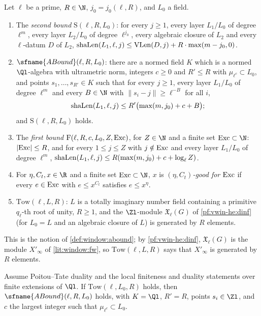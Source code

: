 \begin{definition}\label{pf:vwin:abound}
Let $\ell$ be a prime, $R\in\N$, $j_0=j_0(\ell,R)$, and $L_0$ a field.
\begin{enumerate}[label=(\alph*)]
\item The \emph{second bound} $\mathrm{S}(\ell,R,L_0)$: for every $j\ge1$, every layer $L_1/L_0$ of degree $\ell^m$, every
layer $L_2/L_0$ of degree $\ell^{j_0}$, every algebraic closure of $L_2$ and every $\ell$-datum $D$ of $L_2$,
$\mathrm{shaLen}(L_1,\ell,j)\le\mathrm{VLen}(D,j)+R\cdot\max(m-j_0,0)$.
\item $\sfname{ABound}(\ell,R,L_0)$: there are a normed field $K$ which is a normed $\Ql$-algebra with ultrametric norm,
integers $c\ge0$ and $R'\le R$ with $\mu_{\ell^c}\subset L_0$, and points $s_1,\dots,s_{R'}\in K$ such that for every $j\ge1$,
every layer $L_1/L_0$ of degree $\ell^m$ and every $B\in\N$ with $\|s_i-j\|\ge\ell^{-B}$ for all $i$,
\[
 \mathrm{shaLen}(L_1,\ell,j)\le R'\bigl(\max(m,j_0)+c+B\bigr);
\]
and $\mathrm{S}(\ell,R,L_0)$ holds.
\item The \emph{first bound} $\mathrm{F}(\ell,R,c,L_0,Z,\mathrm{Exc})$, for $Z\in\N$ and a finite set $\vwinexc\subset\N$: $|\mathrm{Exc}|\le R$, and
for every $1\le j\le Z$ with $j\notin\mathrm{Exc}$ and every layer $L_1/L_0$ of degree $\ell^m$,
$\mathrm{shaLen}(L_1,\ell,j)\le R(\max(m,j_0)+c+\log_\ell Z)$.
\item For $\eta,C_t,x\in\R$ and a finite set $\vwinexc\subset\N$, $x$ is \emph{$(\eta,C_t)$-good for $\mathrm{Exc}$} if every
$e\in\mathrm{Exc}$ with $e\le x^{C_t}$ satisfies $e\le x^\eta$.
\item $\mathrm{Tow}(\ell,L,R)$: $L$ is a totally imaginary number field containing a primitive $q_\ell$-th root of unity,
$R\ge1$, and the $\Zl$-module $\mathfrak X_\ell(G)$ of \cref{pf:vwin-he:dinf} (for $L_0=L$ and an algebraic closure of $L$) is
generated by $R$ elements.
\end{enumerate}
\end{definition}

This is the notion of \cref{def:window:abound}; by \cref{pf:vwin-he:dinf}, $\mathfrak X_\ell(G)$ is the module $X'_\infty$ of
\cref{lit:window:fw}, so $\mathrm{Tow}(\ell,L,R)$ says that $X'_\infty$ is generated by $R$ elements.

\begin{theorem}\label{pf:vwin:tower}
Assume Poitou--Tate duality and the local finiteness and duality statements over finite extensions of $\Ql$. If
$\mathrm{Tow}(\ell,L_0,R)$ holds, then $\sfname{ABound}(\ell,R,L_0)$ holds, with $K=\Ql$, $R'=R$, points $s_i\in\Zl$, and $c$ the
largest integer such that $\mu_{\ell^c}\subset L_0$.
\end{theorem}

